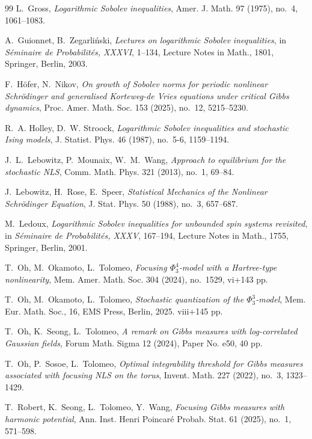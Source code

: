 \documentclass[letterpaper, 11pt,  reqno]{amsart}
\theoremstyle{definition}
\newcommand{\1}{\mathbbm 1}
\newcommand{\0}{\mathbf 0}
\numberwithin{equation}{section}
\numberwithin{theorem}{section}
\begin{document}
\begin{thebibliography}{99}
L.~Gross, 
{\it Logarithmic Sobolev inequalities}, 
Amer. J. Math. 97 (1975), no.~4, 1061--1083.
 
A.~Guionnet, B.~Zegarli\'nski, 
{\it Lectures on logarithmic Sobolev inequalities}, in {\it S\'eminaire de Probabilit\'es, XXXVI}, 1--134, Lecture Notes in Math., 1801, Springer, Berlin, 2003.
 
F.~H\"ofer, N.~Nikov, {\it On growth of Sobolev norms for periodic nonlinear Schr\"odinger and generalised Korteweg-de Vries equations under critical Gibbs dynamics}, Proc. Amer. Math. Soc. 153 (2025), no.~12, 5215--5230.
 
 
R.~A. Holley, D.~W. Stroock, 
{\it Logarithmic Sobolev inequalities and stochastic Ising models}, 
J. Statist. Phys. 46 (1987), no.~5-6, 1159--1194.
 
 
J.~L.~Lebowitz, P.~Mounaix, W.~M.~Wang, 
{\it Approach to equilibrium for the stochastic NLS}, 
Comm. Math. Phys. 321 (2013), no.~1, 69--84.
 
J.~Lebowitz, H.~Rose, E.~Speer, 
{\it Statistical Mechanics of the Nonlinear Schr\"{o}dinger Equation}, 
J. Stat. Phys. 50 (1988), no.~3, 657--687.
 
M.~Ledoux, 
{\it Logarithmic Sobolev inequalities for unbounded spin systems revisited}, 
in {\it S\'eminaire de Probabilit\'es, XXXV}, 167--194, Lecture Notes in Math., 1755, Springer, Berlin, 2001.
 
T.~Oh, M.~Okamoto, L.~Tolomeo, 
{\it Focusing $\Phi^4_3$-model with a Hartree-type nonlinearity}, Mem. Amer. Math. Soc. 304 (2024), no.~1529, vi+143 pp.
 
T.~Oh, M.~Okamoto, L.~Tolomeo,
{\it Stochastic quantization of the $\Phi^3_3$-model},
Mem. Eur. Math. Soc., 16, 
EMS Press, Berlin, 2025. viii+145 pp.
 
T.~Oh, K.~Seong, L.~Tolomeo, 
{\it A remark on Gibbs measures with log-correlated Gaussian fields}, 
Forum Math. Sigma 12 (2024), Paper No. e50, 40 pp.
 
T.~Oh, P.~Sosoe, L.~Tolomeo, 
{\it Optimal integrability threshold for Gibbs measures associated with focusing NLS on the torus}, 
Invent. Math. 227 (2022), no.~3, 1323--1429.
 
T.~Robert, K.~Seong, L.~Tolomeo, Y.~Wang, 
{\it Focusing Gibbs measures with harmonic potential}, 
Ann. Inst. Henri Poincar\'e Probab. Stat. 61 (2025), no.~1, 571--598.
 

\end{thebibliography}
\end{document}
